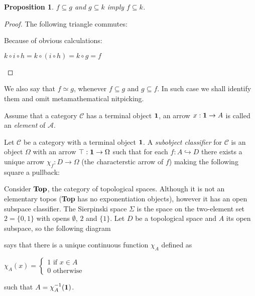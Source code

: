 \documentclass[a4paper]{article}
\theoremstyle{defin}
\theoremstyle{theorem}
\theoremstyle{claim}
\theoremstyle{prop}
\newtheorem{prop}{Proposition}
\theoremstyle{lemma}
\theoremstyle{fact}
\theoremstyle{ex}
\theoremstyle{col}
\begin{document}
\begin{prop}
$f \subseteq g$ and $g \subseteq k$ imply $f \subseteq k$.
\end{prop}

\begin{proof}
The following triangle commutes:

Because of obvious calculations:
\begin{center}
$k \circ i \circ h = k \circ (i \circ h) = k \circ g = f$
\end{center}
\end{proof}

We also say that $f \simeq g$, whenever $f \subseteq g$ and $g \subseteq f$. In such case we shall identify them and omit metamathematical nitpicking.

Assume that a category $\mathcal{C}$ has a terminal object ${\bf 1}$, an arrow $x : {\bf 1} \to A$ is called an \emph{element} of $\mathcal{A}$.

Let $\mathcal{C}$ be a category with a terminal object ${\bf 1}$. A \emph{subobject classifier} for $\mathcal{C}$ is an object $\Omega$ with an arrow $\top : {\bf 1} \to \Omega$ such that for each $f : A \hookrightarrow D$ there exists a unique arrow $\chi_f : D \to \Omega$ (the {\emph characterstic arrow} of $f$) making the following square a pullback:


Consider ${\bf Top}$, the category of topological spaces. Although it is not an elementary topos ({\bf Top} has no exponentiation objects), however it has an open subspace classifier.
The Sierpinski space $\Sigma$ is the space on the two-element set $2 = \{ 0, 1 \}$ with opens $\emptyset$, $2$ and $\{ 1 \}$. Let $D$ be a topological space and $A$ its open subspace, so the following diagram


says that there is a unique continuous function $\chi_A$ defined as
\begin{center}
$\chi_A(x) = \begin{cases} 1 \text{  if $x \in A$} \\ 0 \text{  otherwise} \end{cases} $
\end{center}
such that $A = \chi_A^{-1}({\bf 1})$.
\end{document}
